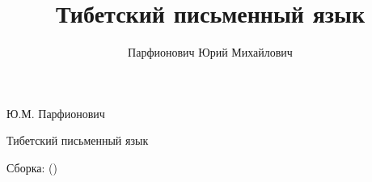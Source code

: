 \documentclass[a4paper,fontsize=14pt,openany,DIV=20]{scrreprt}
\author{Парфионович Юрий Михайлович}
\title{Тибетский письменный язык}
\begin{document}
\begin{titlepage}
    \centering
    \vspace*{\fill}
    {\Large Ю.М. Парфионович\par}
    \vspace{5em}
    {\Huge Тибетский письменный язык\par}
    \vspace*{\fill}
    Сборка\gitRels: \gitAbbrevHash{} (\gitAuthorDate)
\end{titlepage}
\setcounter{tocdepth}{4}
\tableofcontents












\end{document}
